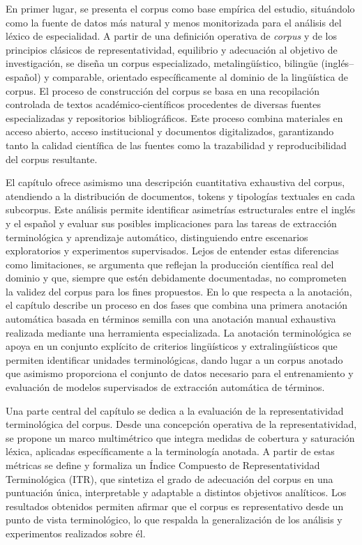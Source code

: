 En primer lugar, se presenta el corpus como base empírica del estudio, situándolo como la fuente de datos más natural y menos monitorizada para el análisis del léxico de especialidad. A partir de una definición operativa de \textit{corpus} y de los principios clásicos de representatividad, equilibrio y adecuación al objetivo de investigación, se diseña un corpus especializado, metalingüístico, bilingüe (inglés–español) y comparable, orientado específicamente al dominio de la lingüística de corpus. El proceso de construcción del corpus se basa en una recopilación controlada de textos académico-científicos procedentes de diversas fuentes especializadas y repositorios bibliográficos. Este proceso combina materiales en acceso abierto, acceso institucional y documentos digitalizados, garantizando tanto la calidad científica de las fuentes como la trazabilidad y reproducibilidad del corpus resultante. 

El capítulo ofrece asimismo una descripción cuantitativa exhaustiva del corpus, atendiendo a la distribución de documentos, tokens y tipologías textuales en cada subcorpus. Este análisis permite identificar asimetrías estructurales entre el inglés y el español y evaluar sus posibles implicaciones para las tareas de extracción terminológica y aprendizaje automático, distinguiendo entre escenarios exploratorios y experimentos supervisados. Lejos de entender estas diferencias como limitaciones, se argumenta que reflejan la producción científica real del dominio y que, siempre que estén debidamente documentadas, no comprometen la validez del corpus para los fines propuestos. En lo que respecta a la anotación, el capítulo describe un proceso en dos fases que combina una primera anotación automática basada en términos semilla con una anotación manual exhaustiva realizada mediante una herramienta especializada. La anotación terminológica se apoya en un conjunto explícito de criterios lingüísticos y extralingüísticos que permiten identificar unidades terminológicas, dando lugar a un corpus anotado que asimismo proporciona el conjunto de datos necesario para el entrenamiento y evaluación de modelos supervisados de extracción automática de términos.

Una parte central del capítulo se dedica a la evaluación de la representatividad terminológica del corpus. Desde una concepción operativa de la representatividad, se propone un marco multimétrico que integra medidas de cobertura y saturación léxica, aplicadas específicamente a la terminología anotada. A partir de estas métricas se define y formaliza un Índice Compuesto de Representatividad Terminológica (ITR), que sintetiza el grado de adecuación del corpus en una puntuación única, interpretable y adaptable a distintos objetivos analíticos. Los resultados obtenidos permiten afirmar que el corpus es representativo desde un punto de vista terminológico, lo que respalda la generalización de los análisis y experimentos realizados sobre él.

